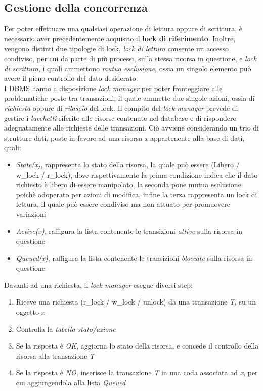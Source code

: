 \documentclass{article}
\begin{document}
\subsection*{Gestione della concorrenza}
\large
Per poter effettuare una qualsiasi operazione di lettura oppure di scrittura, è necessario aver precedentemente acquisito il \textbf{lock di riferimento}. Inoltre, vengono distinti due tipologie di lock, \textit{lock di lettura} consente un accesso condiviso, per cui da parte di più processi, sulla stessa ricorsa in questione, e \textit{lock di scrittura}, i quali ammettono \textit{mutua esclusione}, ossia un singolo elemento può avere il pieno controllo del dato desiderato.\vspace*{14pt}\\
I DBMS hanno a disposizione \textit{lock manager} per poter fronteggiare alle problematiche poste tra transazioni, il quale ammette due singole azioni, ossia di \textit{richiesta} oppure di \textit{rilascio} del lock. Il compito del \textit{lock manager} prevede di gestire i \textit{lucchetti} riferite alle risorse contenute nel database e di rispondere adeguatamente alle richieste delle transazioni. Ciò avviene considerando un trio di strutture dati, poste in favore ad una risorsa \textit{x} appartenente alla base di dati, quali:
\begin{itemize}[label={-}]
    \itemsep0em
    \item \textit{State(x)}, rappresenta lo stato della risorsa, la quale può essere (Libero / w\_lock / r\_lock), dove rispettivamente la prima condizione indica che il dato richiesto è libero di essere manipolato, la seconda pone mutua esclusione poichè adoperato per azioni di modifica, infine la terza rappresenta un lock di lettura, il quale può essere condiviso ma non attuato per promuovere variazioni
    \item \textit{Active(x)}, raffigura la lista contenente le transizioni \textit{attive} sulla risorsa in questione
    \item \textit{Queued(x)}, raffigura la lista contenente le transizioni \textit{bloccate} sulla risorsa in questione
\end{itemize}
Davanti ad una richiesta, il \textit{lock manager} esegue diversi step:
\begin{enumerate}[label={-}]
    \item Riceve una richiesta (r\_lock / w\_lock / unlock) da una transazione \textit{T}, su un oggetto \textit{x}
    \item Controlla la \textit{tabella stato/azione}
    \item Se la risposta è \textit{OK}, aggiorna lo stato della risorsa, e concede il controllo della risorsa alla transazione \textit{T}
    \item Se la risposta è \textit{NO}, inserisce la transazione \textit{T} in una coda associata ad \textit{x}, per cui aggiungendola alla lista \textit{Queued}
\end{enumerate}
\end{document}

